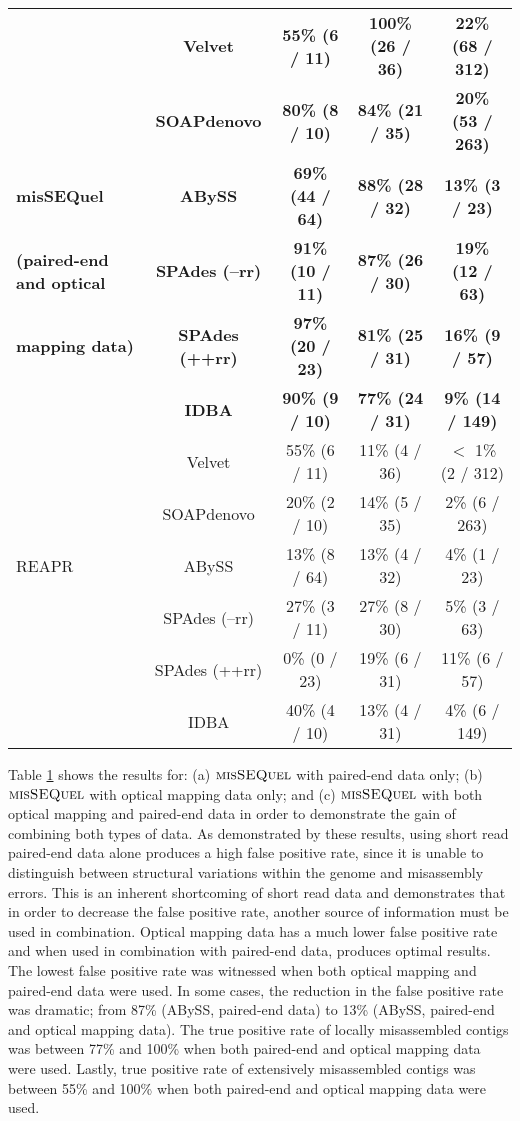 \begin{table}[h!]
\begin{center}
{\begin{tabular}{|l|c|c|c|c|}
							& {\bf Velvet}					& {\bf 55\% (6 / 11)}			& {\bf 100\% (26 / 36)}		&	{\bf 22\% (68 / 312)}	\\ 
							& {\bf  SOAPdenovo}				& {\bf 80\% (8 / 10)}			&{\bf 84\% (21 / 35)}			&	{\bf 20\% (53 / 263)}	\\
 {\sc\bf misSEQuel}				& {\bf ABySS}					& {\bf 69\% (44 / 64)}			& {\bf 88\% (28 / 32)}			&	{\bf 13\% (3 / 23)}		\\ 
{\bf (paired-end and optical}	& {\bf  SPAdes (--rr)}				&{\bf 91\% (10 / 11)}			& {\bf 87\% (26 / 30)}			&	{\bf 19\% (12 / 63)}		\\ 
{\bf mapping data)}				& {\bf SPAdes (++rr)}				&{\bf 97\% (20 / 23)}			& {\bf 81\% (25 / 31)}			&	{\bf 16\% (9 / 57)}		\\ 
							& {\bf IDBA}					&{\bf 90\% (9 / 10)}			&{\bf  77\% (24 / 31)}			&	{\bf 9\% (14 / 149)}		\\ 
\hline \hline
							& Velvet						& 55\% (6 / 11)		& 11\% (4 / 36)				& $<$ 1\% (2 / 312)		\\ 
							& SOAPdenovo				& 20\% (2 / 10)		& 14\% (5 / 35)				& 2\% (6 / 263)	\\  
REAPR						& ABySS						& 13\% (8 / 64)		& 13\% (4 / 32)				& 4\% (1 / 23)			\\  
							& SPAdes (--rr)					& 27\% (3 / 11)		& 27\% (8 / 30)				& 5\% (3 / 63)			\\ 
							& SPAdes (++rr)				& 0\% (0 / 23)		& 19\% (6 / 31)				& 11\% (6 / 57)		\\
							& IDBA						& 40\% (4 / 10)		& 13\% (4 / 31)				& 4\% (6 / 149)			\\ 
\hline
\end{tabular}}
\label{tab:roc}
\end{center}
\end{table}



Table \ref{tab:roc} shows the results for: (a) $\mbox{\rm {\sc misSEQuel}}$ with paired-end data only; (b) $\mbox{\rm {\sc misSEQuel}}$ with optical mapping data only; and (c) $\mbox{\rm {\sc misSEQuel}}$ with both optical mapping and paired-end data in order to demonstrate the gain of combining both types of data.  
As demonstrated by these results, using short read paired-end data alone produces a high false positive rate, since it is unable to distinguish between structural variations within the genome and misassembly errors.  
This is an inherent shortcoming of short read data and demonstrates that in order to decrease the false positive rate, another source of information must be used in combination.
Optical mapping data has a much lower false positive rate and when used in combination with paired-end data, produces optimal results.  The lowest false positive rate was witnessed when both optical mapping and paired-end data were used.  In some cases, the reduction in the false positive rate was dramatic; from 87\% (ABySS, paired-end data) to 13\% (ABySS, paired-end and optical mapping data).  The true positive rate of locally misassembled contigs was between 77\% and 100\% when both paired-end and optical mapping data were used.  Lastly, true positive rate of extensively misassembled contigs was between 55\% and 100\% when both paired-end and optical mapping data were used. 

